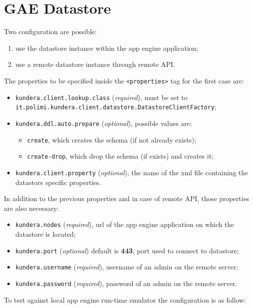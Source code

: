 \section{GAE Datastore}
\label{appendix:datastore-config}
Two configuration are possible:
\begin{enumerate}
\item use the datastore instance within the app engine application;
\item use a remote datastore instance through remote API.
\end{enumerate}

\newparagraph The properties to be specified inside the \texttt{<properties>} tag for the first case are:
\begin{itemize}
\item \texttt{kundera.client.lookup.class} (\textit{required}), must be set to \\ \texttt{it.polimi.kundera.client.datastore.DatastoreClientFactory};
\item \texttt{kundera.ddl.auto.prepare} (\textit{optional}), possible values are:
\begin{itemize}
\item \texttt{create}, which creates the schema (if not already exists);
\item \texttt{create-drop}, which drop the schema (if exists) and creates it;
\end{itemize}
\item \texttt{kundera.client.property} (\textit{optional}), the name of the xml file containing the datastore specific properties.
\end{itemize}

\noindent In addition to the previous properties and in case of remote API, those properties are also necessary:
\begin{itemize}
\item \texttt{kundera.nodes} (\textit{required}), url of the app engine application on which the datastore is located;
\item \texttt{kundera.port} (\textit{optional}) default is \textbf{443}, port used to connect to datastore;
\item \texttt{kundera.username} (\textit{required}), username of an admin on the remote server;
\item \texttt{kundera.password} (\textit{required}), password of an admin on the remote server.
\end{itemize}

\noindent To test against local app engine run-time emulator the configuration is as follow:

